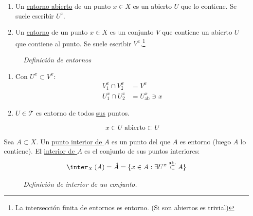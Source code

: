 \begin{defi}
\begin{enumerate}
    \item Un \underline{entorno abierto} de un punto $x \in X$ es un abierto $U$ que lo contiene. Se suele escribir $U^x$.
    \item Un \underline{entorno} de un punto $x \in X$ es un conjunto $V$ que contiene un abierto $U$ que contiene al punto. Se suele escribir $V^x$.\footnote{La intersección finita de entornos es entorno. (Si son abiertos es trivial)}
\end{enumerate}
\end{defi}

\begin{figure}[H]
    \centering
    \caption{\textit{Definición de entornos}}
    \label{fig:definición-entornos}
\end{figure}

\begin{obs}    
\begin{enumerate}
    \item Con $U^x \subset V^x$:
    \begin{align*}
        V_1^x \cap V_2^x &= V^x\\
        U_1^x \cap U_2^x &= U_{\text{ab}}^x \ni x
    \end{align*}

    \item $U \in \mathcal{T}$ es entorno de todos \underline{sus} puntos.
    \begin{demo}
    \[
    x \in U \text{ abierto} \subset U
    \]
    \end{demo}
\end{enumerate}
\end{obs}

\begin{defi}
Sea $A \subset X$. Un \underline{punto interior de $A$} es un punto del que $A$ es entorno (luego $A$ lo contiene). El \underline{interior de $A$} es el conjunto de sus puntos interiores:
\[
\inter_X \left( A \right) = \mathring{A} = \{x \in A: \exists U^x \stackrel{\text{ab.}}{\subset}  A\} 
\]
\end{defi}

\begin{figure}[H]
    \centering
    \caption{\textit{Definición de interior de un conjunto.}}
    \label{fig:definición-interior}
\end{figure}

